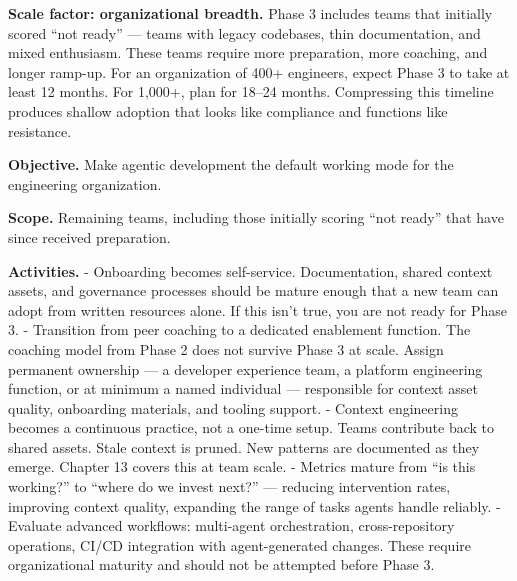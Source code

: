 \documentclass[
  a4paper,
  DIV=11,
  numbers=noendperiod]{scrreprt}
\begin{document}
\textbf{Scale factor: organizational breadth.} Phase 3 includes teams
that initially scored ``not ready'' --- teams with legacy codebases,
thin documentation, and mixed enthusiasm. These teams require more
preparation, more coaching, and longer ramp-up. For an organization of
400+ engineers, expect Phase 3 to take at least 12 months. For 1,000+,
plan for 18--24 months. Compressing this timeline produces shallow
adoption that looks like compliance and functions like resistance.

\textbf{Objective.} Make agentic development the default working mode
for the engineering organization.

\textbf{Scope.} Remaining teams, including those initially scoring ``not
ready'' that have since received preparation.

\textbf{Activities.} - Onboarding becomes self-service. Documentation,
shared context assets, and governance processes should be mature enough
that a new team can adopt from written resources alone. If this isn't
true, you are not ready for Phase 3. - Transition from peer coaching to
a dedicated enablement function. The coaching model from Phase 2 does
not survive Phase 3 at scale. Assign permanent ownership --- a developer
experience team, a platform engineering function, or at minimum a named
individual --- responsible for context asset quality, onboarding
materials, and tooling support. - Context engineering becomes a
continuous practice, not a one-time setup. Teams contribute back to
shared assets. Stale context is pruned. New patterns are documented as
they emerge. Chapter 13 covers this at team scale. - Metrics mature from
``is this working?'' to ``where do we invest next?'' --- reducing
intervention rates, improving context quality, expanding the range of
tasks agents handle reliably. - Evaluate advanced workflows: multi-agent
orchestration, cross-repository operations, CI/CD integration with
agent-generated changes. These require organizational maturity and
should not be attempted before Phase 3.
\end{document}
